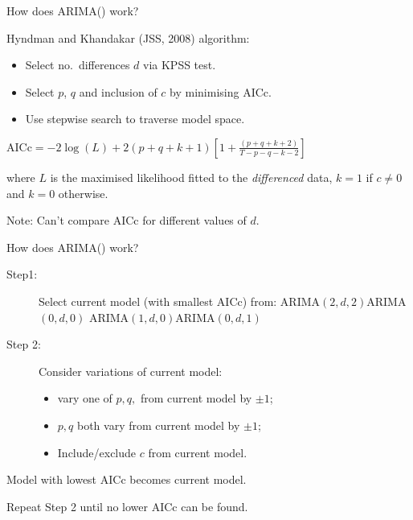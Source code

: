 \documentclass[
  14pt,
  ignorenonframetext,
  aspectratio=169,
]{beamer}
\providecommand{\tightlist}{%
  \setlength{\itemsep}{0pt}\setlength{\parskip}{0pt}}\usepackage{longtable,booktabs,array}
\begin{document}
\begin{frame}{How does ARIMA() work?}
\protect\hypertarget{how-does-arima-work}{}
\begin{alertblock}{Hyndman and Khandakar (JSS, 2008) algorithm:}
\begin{itemize}\tightlist
\item Select no.\ differences $d$ via KPSS test.
\item Select $p$, $q$ and inclusion of $c$ by minimising AICc.
\item Use stepwise search to traverse model space.
\end{itemize}
\end{alertblock}\pause

\begin{block}{}
\centerline{$\displaystyle \text{AICc} = -2 \log(L) + 2(p+q+k+1)\left[1 + \frac{(p+q+k+2)}{T-p-q-k-2}\right]$}
where $L$ is the maximised likelihood fitted to the \textit{differenced} data,
$k=1$ if $c\neq 0$ and $k=0$ otherwise.\pause
\end{block}

Note: Can't compare AICc for different values of \(d\).
\end{frame}

\begin{frame}{How does ARIMA() work?}
\protect\hypertarget{how-does-arima-work-1}{}
\fontsize{12.5}{14.5}\sf

\begin{description}
\item[Step1:]
Select current model (with smallest AICc) from:\newline
ARIMA\((2,d,2)\)\newline ARIMA\((0,d,0)\)\newline
ARIMA\((1,d,0)\)\newline ARIMA\((0,d,1)\) \pause\vspace*{-0.1cm}
\item[Step 2:]
Consider variations of current model:

\begin{itemize}
\tightlist
\item
  vary one of \(p,q,\) from current model by \(\pm1\);
\item
  \(p,q\) both vary from current model by \(\pm1\);
\item
  Include/exclude \(c\) from current model.
\end{itemize}
\end{description}

Model with lowest AICc becomes current model.

\pause\alert{Repeat Step 2 until no lower AICc can be found.}
\end{frame}
\end{document}
